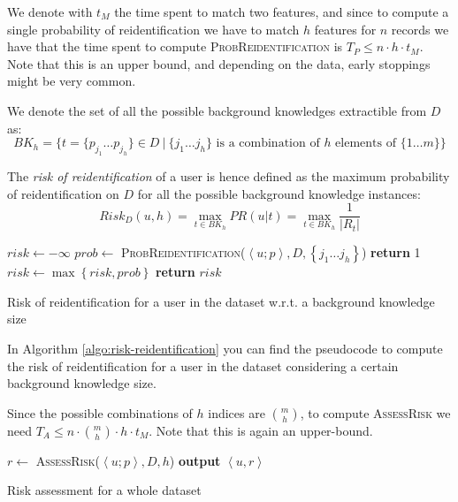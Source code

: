 \documentclass[a4paper]{article}
\begin{document}
We denote with $t_M$ the time spent to match two features, and since to compute a single probability of reidentification we have to match $h$ features for $n$ records we have that the time spent to compute \textsc{ProbReidentification} is $T_P \le n \cdot h \cdot t_M$. Note that this is an upper bound, and depending on the data, early stoppings might be very common.

We denote the set of all the possible background knowledges extractible from $D$ as:
$$
    BK_h = \{t = \{p_{j_1} \dots p_{j_h}\} \in D\ |\ \{j_1 \dots j_h\} \text{ is a combination of } h \text{ elements of } \{1 \dots m\}\}
$$

The \textit{risk of reidentification} of a user is hence defined as the maximum probability of reidentification on $D$ for all the possible background knowledge instances:
$$
    Risk_D(u, h) = \max\limits_{t \in BK_h} PR(u|t) = \max\limits_{t \in BK_h} \frac{1}{|R_t|}
$$
\begin{algorithm}
    \begin{algorithmic}
            \State $risk \gets -\infty$
                \State $prob \gets$ \textsc{ProbReidentification}($\left < u; p \right >, D, \left \{ j_1 \dots j_h \right \}$)
                    \State \textbf{return} 1
                \EndIf
                \State $risk \gets \max \left \{ risk, prob \right \}$
            \EndFor
            \State \textbf{return} $risk$
        \EndFunction
    \end{algorithmic}
    \caption{Risk of reidentification for a user in the dataset w.r.t. a background knowledge size}
    \label{algo:risk-reidentification}
\end{algorithm}

In Algorithm \ref{algo:risk-reidentification} you can find the pseudocode to compute the risk of reidentification for a user in the dataset considering a certain background knowledge size.

Since the possible combinations of $h$ indices are $\binom{m}{h}$, to compute \textsc{AssessRisk} we need $T_A \le n \cdot \binom{m}{h} \cdot h \cdot t_M$. Note that this is again an upper-bound.

\begin{algorithm}
    \begin{algorithmic}
                \State $r \gets$ \textsc{AssessRisk}($\left < u; p \right >, D, h$)
                \State \textbf{output} $\left < u, r \right >$
            \EndFor
        \EndFunction
    \end{algorithmic}
    \caption{Risk assessment for a whole dataset}
    \label{algo:risk-dataset}
\end{algorithm}
\end{document}
